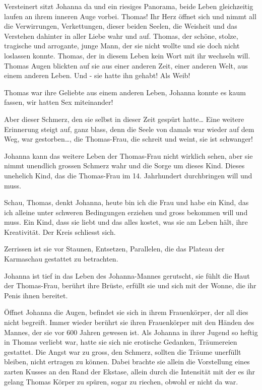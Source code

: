 \documentclass[10pt,titlepage,a5paper]{book}
\begin{document}
Versteinert sitzt Johanna da und ein riesiges Panorama, beide Leben gleichzeitig laufen an ihrem inneren Auge vorbei. Thomas! Ihr Herz öffnet sich und nimmt all die Verwirrungen, Verkettungen, dieser beiden Seelen, die Weisheit und das Verstehen dahinter in aller Liebe  wahr und auf.
Thomas, der schöne, stolze, tragische und arrogante, junge Mann, der sie nicht wollte und sie doch nicht loslassen konnte. Thomas, der in diesem Leben kein Wort mit ihr wechseln will. Thomas Augen blickten auf sie aus einer anderen Zeit, einer anderen Welt, aus einem anderen Leben.
Und - sie hatte ihn gehabt! Als Weib!

Thomas war ihre Geliebte aus einem anderen Leben, Johanna konnte es kaum fassen, wir hatten Sex miteinander!

Aber dieser Schmerz, den sie selbst in dieser Zeit gespürt hatte\dots 
Ei\-ne weitere Erinnerung steigt auf, ganz blass, denn die Seele von damals war wieder auf dem Weg, war gestorben\dots , die Thomas-Frau, die schreit und weint, sie ist schwanger!

Johanna kann das weitere Leben der Thomas-Frau nicht wirklich sehen, aber sie nimmt unendlich grossen Schmerz wahr und die Sorge um dieses Kind. Dieses unehelich Kind, das die Thomas-Frau im 14. Jahrhundert durchbringen will und muss.

Schau, Thomas, denkt Johanna, heute bin ich die Frau und habe ein Kind, das ich alleine unter schweren Bedingungen erziehen und gross bekommen will und  muss. Ein Kind, dass sie liebt und das alles kostet, was sie am Leben hält, ihre Kreativität. Der Kreis schliesst sich.

Zerrissen ist sie vor Staunen, Entsetzen, Parallelen, die das Plateau der Karmaschau gestattet zu betrachten.

Johanna ist tief in das Leben des Johanna-Mannes gerutscht, sie fühlt die Haut der Thomas-Frau, berührt ihre Brüste, erfüllt sie und sich mit der Wonne, die ihr Penis ihnen bereitet.

Öffnet Johanna die Augen, befindet sie sich in ihrem Frauenkörper, der all dies nicht begreift. Immer wieder berührt sie ihren Frauenkörper mit den Händen des Mannes, der sie vor 600 Jahren gewesen ist. Als Johanna in ihrer Jugend so heftig in Thomas verliebt war, hatte sie sich nie erotische Gedanken, Träumereien gestattet. Die Angst war zu gross, den Schmerz, sollten die Träume unerfüllt bleiben, nicht ertragen zu können. Dabei brachte sie allein die Vorstellung eines zarten Kusses an den Rand der Ekstase, allein durch die Intensität mit der es ihr gelang Thomas Körper zu spüren, sogar zu riechen, obwohl er nicht da war.
\end{document}
